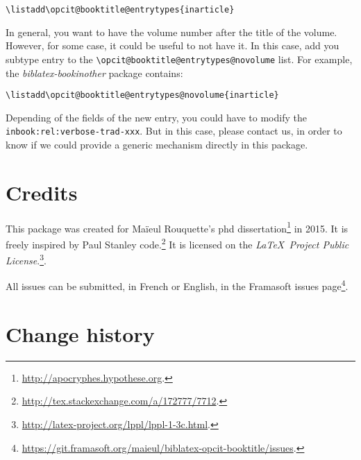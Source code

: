 \documentclass{ltxdockit}[2011/03/25]
\begin{document}
\begin{verbatim}
\listadd\opcit@booktitle@entrytypes{inarticle}
\end{verbatim}

In general, you want to have the volume number after the title of the volume. However, for some case, it could be useful to not have it. In this case, add you subtype entry to the \verb+\opcit@booktitle@entrytypes@novolume+ list. For example, the \emph{biblatex-bookinother} package contains:

\begin{verbatim}
\listadd\opcit@booktitle@entrytypes@novolume{inarticle}
\end{verbatim}

Depending of the fields of the new entry, you could have to modify the \verb+inbook:rel:verbose-trad-xxx+. But in this case, please contact us, in order to know if we could provide a generic mechanism directly in this package.
\section{Credits}



This package was created for Maïeul Rouquette's phd dissertation\footnote{\url{http://apocryphes.hypothese.org}.} in 2015. It is freely inspired by Paul Stanley code.\footnote{\url{http://tex.stackexchange.com/a/172777/7712}.} It is licensed on the \emph{\LaTeX\ Project Public License}.\footnote{\url{http://latex-project.org/lppl/lppl-1-3c.html}.}.


All issues can be submitted, in French or English, in the Framasoft issues page\footnote{\url{https://git.framasoft.org/maieul/biblatex-opcit-booktitle/issues}.}.


\section{Change history}
\end{document}
